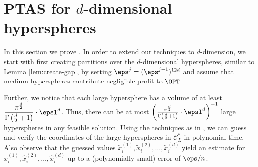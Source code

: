 \section{\textsf{PTAS} for $d$-dimensional hyperspheres}
In this section we prove .
	In order to extend our techniques to \(d\)-dimension, we start with first creating partitions over the \(d\)-dimensional hyperspheres, similar to Lemma \ref{lem:create-gap},  by setting \(\eps^{j}=(\eps^{j-1})^{12d}\) and assume that medium hyperspheres contribute negligible profit to $\OPT$.
	
	Further, we notice that each large hypersphere has a volume of at least \( \dfrac{\pi^{\frac{d}{2}}}{\Gamma\left(\frac{d}{2} + 1\right)} \cdot \epsl^d
	\). Thus, there can be at most  \(\left(\frac{\pi^{\frac{d}{2}}}{\Gamma\left(\frac{d}{2} + 1\right)} \cdot \epsl^d\right)^{-1}\)  
 large hyperspheres in any feasible solution. Using the techniques as in , we can guess and verify the coordinates of the large hyperspheres in \(\mathcal{C}_{L}^*\) in polynomial time. Also observe that the guessed values $\tilde{x}_{i}^{(1)},\tilde{x}_{i}^{(2)},\dots,\tilde{x}_{i}^{(d)}$
	yield an estimate for $\hat{x}_{i}^{(1)},\hat{x}_{i}^{(2)},\dots,\hat{x}_{i}^{(d)}$ up to a (polynomially small) error of $\eps/n$.
	
